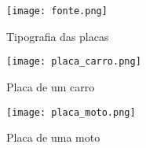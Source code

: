 \begin{figure}[H]
		\centering
		\texttt{[image: fonte.png]}
		\caption{Tipografia das placas}
		\label{fig:tipografia}
\end{figure}

\begin{figure}[H]
		\centering
		\texttt{[image: placa\_carro.png]}
		\caption{Placa de um carro}
		\label{fig:placa_carro}
\end{figure}

\begin{figure}[H]
		\centering
		\texttt{[image: placa\_moto.png]}
		\caption{Placa de uma moto}
		\label{fig:placa_moto}
\end{figure}

